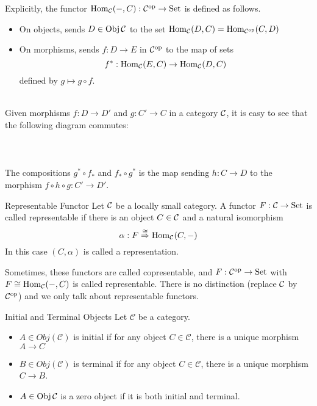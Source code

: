 \documentclass[a4paper]{article}
\begin{document}
Explicitly, the functor $\operatorname{Hom}_{\mathcal{C}}(-,C):\mathcal{C}^{\text{op}}\to\text{Set}$ is defined as follows. 
\begin{itemize}
\item On objects, sends $D\in\operatorname{Obj}\mathcal{C}$ to the set $\operatorname{Hom}_{\mathcal{C}}(D,C)=\operatorname{Hom}_{\mathcal{C}^{\text{op}}}(C,D)$
\item On morphisms, sends $f:D\to E$ in $\mathcal{C}^{\text{op}}$ to the map of sets $$f^\ast:\operatorname{Hom}_{\mathcal{C}}(E,C)\to\operatorname{Hom}_{\mathcal{C}}(D,C)$$ defined by $g\mapsto g\circ f$. 
\end{itemize}~\\

Given morphisms $f:D\to D'$ and $g:C'\to C$ in a category $\mathcal{C}$, it is easy to see that the following diagram commutes: \\~\\
\\~\\

The compositions $g^\ast\circ f_\ast$ and $f_\ast\circ g^\ast$ is the map sending $h:C\to D$ to the morphism $f\circ h\circ g:C'\to D'$. 

\begin{defn}{Representable Functor}{} Let $\mathcal{C}$ be a locally small category. A functor $F:\mathcal{C}\to\text{Set}$ is called representable if there is an object $C\in\mathcal{C}$ and a natural isomorphism $$\alpha:F\overset{\cong}{\Rightarrow}\operatorname{Hom}_{\mathcal{C}}(C,-)$$ In this case $(C,\alpha)$ is called a representation. 
\end{defn}

Sometimes, these functors are called copresentable, and $F:\mathcal{C}^{\text{op}}\to\text{Set}$ with $F\cong\operatorname{Hom}_{\mathcal{C}}(-,C)$ is called representable. There is no distinction (replace $\mathcal{C}$ by $\mathcal{C}^{\text{op}}$) and we only talk about representable functors. 

\begin{defn}{Initial and Terminal Objects}{} Let $\mathcal{C}$ be a category. 
\begin{itemize}
\item $A\in Obj(\mathcal{C})$ is initial if for any object $C\in\mathcal{C}$, there is a unique morphism $A\to C$
\item $B\in Obj(\mathcal{C})$ is terminal if for any object $C\in\mathcal{C}$, there is a unique morphism $C\to B$. 
\item $A\in\operatorname{Obj}\mathcal{C}$ is a zero object if it is both initial and terminal. 
\end{itemize}
\end{defn}
\end{document}
